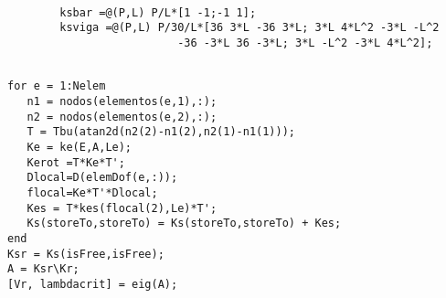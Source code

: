\begin{code}
	\begin{verbatim}
	
		ksbar =@(P,L) P/L*[1 -1;-1 1];
		ksviga =@(P,L) P/30/L*[36 3*L -36 3*L; 3*L 4*L^2 -3*L -L^2
		                  -36 -3*L 36 -3*L; 3*L -L^2 -3*L 4*L^2];
	\end{verbatim}
\end{code}
\begin{code}
	\begin{verbatim}
	
for e = 1:Nelem
   n1 = nodos(elementos(e,1),:);
   n2 = nodos(elementos(e,2),:);
   T = Tbu(atan2d(n2(2)-n1(2),n2(1)-n1(1)));
   Ke = ke(E,A,Le);
   Kerot =T*Ke*T';
   Dlocal=D(elemDof(e,:));
   flocal=Ke*T'*Dlocal;
   Kes = T*kes(flocal(2),Le)*T';
   Ks(storeTo,storeTo) = Ks(storeTo,storeTo) + Kes;
end
Ksr = Ks(isFree,isFree);
A = Ksr\Kr;
[Vr, lambdacrit] = eig(A);
	\end{verbatim}
\end{code}